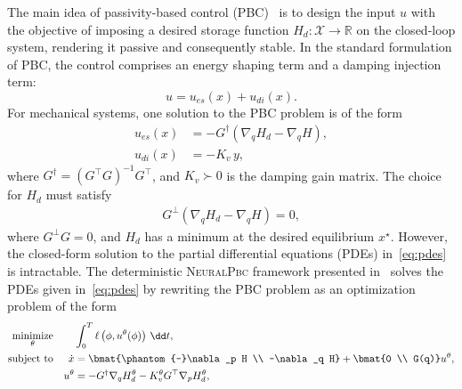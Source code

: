 The main idea of passivity-based control (PBC)~\cite{van2000l2} is to design the
input $u$ with the objective of imposing a desired storage function $H_d:
\mathcal{X} \rightarrow \mathbb{R}$ on the closed-loop system, rendering it
passive and consequently stable.
%
In the standard formulation of PBC, the control comprises an
energy shaping term and a damping injection term:
%
\begin{equation}
  u = u_{es}(x) + u_{di}(x).
  \label{eq:ida-pbc_control}
\end{equation}
%
%
For mechanical systems, one solution to the PBC problem is of the form
%
\begin{align*}
  u_{es}(x) &= 
  -G^{\dagger}
  \left( \nabla_q H_d - \nabla_q H \right), \\
  u_{di}(x) &= - K_{v} \, y,%
\end{align*}
%
where $G^\dagger = \left( G^\top G  \right)^{-1} G^\top$, and $K_v \succ 0$ is the
damping gain matrix. The choice for $H_d$ must satisfy
%
\begin{align}
  G^\bot \left( \nabla_q H_d - \nabla_q H \right) = 0,
  \label{eq:pdes}
\end{align} 
%
where $G^\perp G = 0$, and $H_d$ has a minimum at the desired equilibrium
$x^\star$. However, the closed-form solution to the partial differential
equations (PDEs) in~\eqref{eq:pdes} is intractable. The deterministic
\textsc{NeuralPbc} framework presented in~\cite{neuralpbc} solves the PDEs given
in~\eqref{eq:pdes} by rewriting the PBC problem as an optimization problem of
the form 
\begin{equation}
  \begin{aligned}
      \underset{\theta}{\textrm{minimize}} 
      & & &\int_{0}^{T} \ell \left(\phi,u^{\theta}(\phi) \right) \, \dd t , \\%
      \textrm{subject to}
      & & \dot{x} &= \bmat{\phantom{-}\nabla_p H \\ -\nabla_q H} + \bmat{0 \\ G(q)}u^{\theta}, \\%
      & & u^{\theta} &= -G^{\dagger} \nabla_q H_d^{\theta} - K_v^{\theta} G^\top \nabla_p H_d^{\theta},%
  \end{aligned}
  \label{eq:neural_pbc_finite_optim}
\end{equation}
